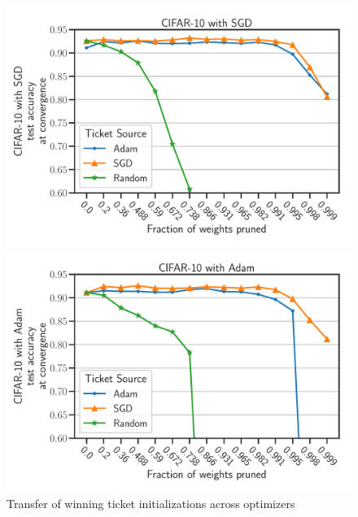     \begin{figure}[h]
        \centering
        \begin{minipage}{.497\textwidth}
        \includegraphics[width=\textwidth]{../openreview/plots/Exp3_CIFAR10_SGD_N.pdf}
        \end{minipage}
        \begin{minipage}{.497\textwidth}
        \includegraphics[width=\textwidth]{../openreview/plots/Exp3_CIFAR10_Adam_N.pdf}
        \end{minipage}
        \caption{Transfer of winning ticket initializations across optimizers}
        \label{fig:exp3}
    \end{figure}
    
